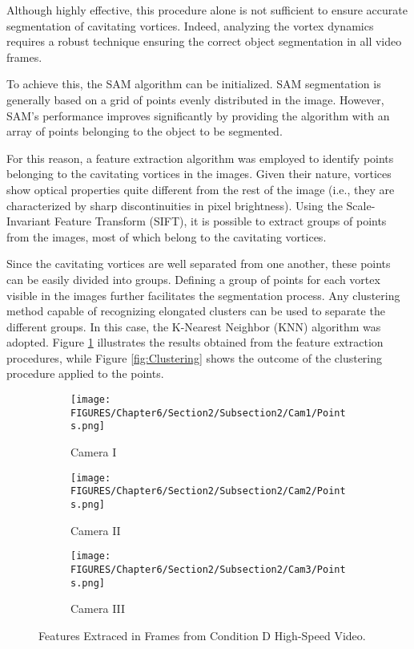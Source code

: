 Although highly effective, this procedure alone is not sufficient to ensure accurate segmentation of cavitating vortices. 
Indeed, analyzing the vortex dynamics requires a robust technique ensuring the correct object segmentation in all video frames.

To achieve this, the SAM algorithm can be initialized. SAM segmentation is generally based on a grid of points evenly distributed in the image. However, SAM's performance improves significantly by providing the algorithm with an array of points belonging to the object to be segmented.

For this reason, a feature extraction algorithm was employed to identify points belonging to the cavitating vortices in the images. Given their nature, vortices show optical properties quite different from the rest of the image (i.e., they are characterized by sharp discontinuities in pixel brightness). Using the Scale-Invariant Feature Transform (SIFT), it is possible to extract groups of points from the images, most of which belong to the cavitating vortices.

Since the cavitating vortices are well separated from one another, these points can be easily divided into groups.
Defining a group of points for each vortex visible in the images further facilitates the segmentation process.
Any clustering method capable of recognizing elongated clusters can be used to separate the different groups.
In this case, the K-Nearest Neighbor (KNN) algorithm was adopted.
Figure \ref{fig:Features} illustrates the results obtained from the feature extraction procedures, while Figure \ref{fig:Clustering} shows the outcome of the clustering procedure applied to the points.

\begin{figure}[htbp]
    \centering
    \begin{subfigure}{0.32\textwidth}
        \centering
        \texttt{[image: FIGURES/Chapter6/Section2/Subsection2/Cam1/Points.png]}
        \caption{Camera I}
    \end{subfigure}
    \begin{subfigure}{0.32\textwidth}
        \centering
        \texttt{[image: FIGURES/Chapter6/Section2/Subsection2/Cam2/Points.png]}
        \caption{Camera II}
    \end{subfigure}
    \begin{subfigure}{0.32\textwidth}
        \centering
        \texttt{[image: FIGURES/Chapter6/Section2/Subsection2/Cam3/Points.png]}
        \caption{Camera III}
    \end{subfigure}
    \caption{Features Extraced in Frames from Condition D High-Speed Video.}
    \label{fig:Features}
\end{figure}

